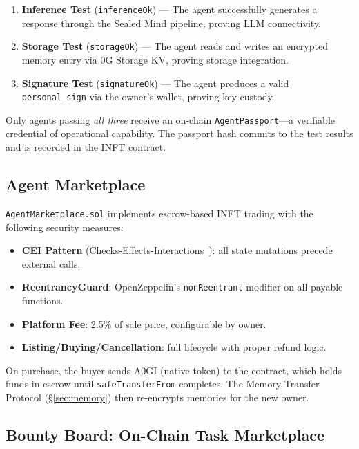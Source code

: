 \documentclass[10pt,a4paper]{article}
\theoremstyle{definition}
\theoremstyle{plain}
\begin{document}
\begin{enumerate}[leftmargin=1.8em, itemsep=2pt, parsep=0pt]
  \item \textbf{Inference Test} (\texttt{inferenceOk}) --- The agent successfully generates a response through the Sealed Mind pipeline, proving LLM connectivity.
  \item \textbf{Storage Test} (\texttt{storageOk}) --- The agent reads and writes an encrypted memory entry via 0G Storage KV, proving storage integration.
  \item \textbf{Signature Test} (\texttt{signatureOk}) --- The agent produces a valid \texttt{personal\_sign} via the owner's wallet, proving key custody.
\end{enumerate}

Only agents passing \emph{all three} receive an on-chain \texttt{AgentPassport}---a verifiable credential of operational capability. The passport hash commits to the test results and is recorded in the INFT contract.

\subsection{Agent Marketplace}

\texttt{AgentMarketplace.sol} implements escrow-based INFT trading with the following security measures:

\begin{itemize}[leftmargin=1.8em, itemsep=2pt, parsep=0pt]
  \item \textbf{CEI Pattern} (Checks-Effects-Interactions~\cite{reentrancy-survey2024}): all state mutations precede external calls.
  \item \textbf{ReentrancyGuard}: OpenZeppelin's \texttt{nonReentrant} modifier on all payable functions.
  \item \textbf{Platform Fee}: 2.5\% of sale price, configurable by owner.
  \item \textbf{Listing/Buying/Cancellation}: full lifecycle with proper refund logic.
\end{itemize}

On purchase, the buyer sends A0GI (native token) to the contract, which holds funds in escrow until \texttt{safeTransferFrom} completes. The Memory Transfer Protocol (\S\ref{sec:memory}) then re-encrypts memories for the new owner.

\subsection{Bounty Board: On-Chain Task Marketplace}
\end{document}

